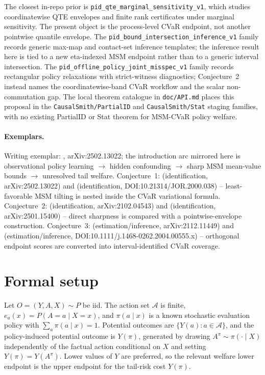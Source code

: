 \documentclass[11pt]{article}
\theoremstyle{definition}
\theoremstyle{plain}
\theoremstyle{remark}
\begin{document}
The closest in-repo prior is \texttt{pid\_qte\_marginal\_sensitivity\_v1}, which studies coordinatewise QTE envelopes and finite rank certificates under marginal sensitivity.  The present object is the process-level CVaR endpoint, not another pointwise quantile envelope.  The \texttt{pid\_bound\_intersection\_inference\_v1} family records generic max-map and contact-set inference templates; the inference result here is tied to a new eta-indexed MSM endpoint rather than to a generic interval intersection.  The \texttt{pid\_offline\_policy\_joint\_misspec\_v1} family records rectangular policy relaxations with strict-witness diagnostics; Conjecture~2 instead names the coordinatewise-band CVaR workflow and the scalar non-commutation gap.  The local theorem catalogue in \texttt{doc/API.md} places this proposal in the \texttt{CausalSmith/PartialID} and \texttt{CausalSmith/Stat} staging families, with no existing PartialID or Stat theorem for MSM-CVaR policy welfare.

\paragraph{Exemplars.}
Writing exemplar: \citet{HessFrauenMelnychukFeuerriegel2025SharpOPE}, arXiv:2502.13022; the introduction arc mirrored here is observational policy learning \(\to\) hidden confounding \(\to\) sharp MSM mean-value bounds \(\to\) unresolved tail welfare.  Conjecture~1: \citet{HessFrauenMelnychukFeuerriegel2025SharpOPE} (identification, arXiv:2502.13022) and \citet{RockafellarUryasev2000CVaR} (identification, DOI:10.21314/JOR.2000.038) -- least-favorable MSM tilting is nested inside the CVaR variational formula.  Conjecture~2: \citet{DornGuo2021QuantileBalancing} (identification, arXiv:2102.04543) and \citet{MastenPoirierRen2025RelaxingUnconfoundedness} (identification, arXiv:2501.15400) -- direct sharpness is compared with a pointwise-envelope construction.  Conjecture~3: \citet{DornGuoKallus2021DoublySharp} (estimation/inference, arXiv:2112.11449) and \citet{ImbensManski2004PartialIDCI} (estimation/inference, DOI:10.1111/j.1468-0262.2004.00555.x) -- orthogonal endpoint scores are converted into interval-identified CVaR coverage.

\section{Formal setup}
Let \(O=(Y,A,X)\sim P\) be iid.  The action set \(\mathcal A\) is finite, \(e_a(x)=P(A=a\mid X=x)\), and \(\pi(a\mid x)\) is a known stochastic evaluation policy with \(\sum_a\pi(a\mid x)=1\).  Potential outcomes are \(\{Y(a):a\in\mathcal A\}\), and the policy-induced potential outcome is \(Y(\pi)\), generated by drawing \(A^\pi\sim\pi(\cdot\mid X)\) independently of the factual action conditional on \(X\) and setting \(Y(\pi)=Y(A^\pi)\).  Lower values of \(Y\) are preferred, so the relevant welfare lower endpoint is the upper endpoint for the tail-risk cost \(Y(\pi)\).
\end{document}
